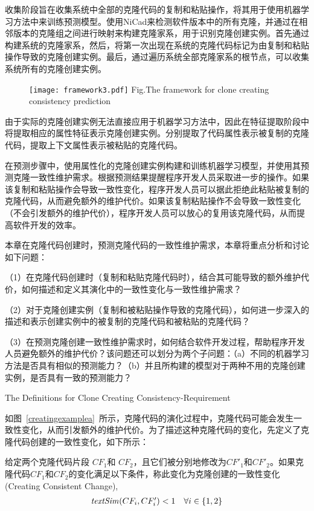 收集阶段旨在收集系统中全部的克隆代码的复制和粘贴操作，将其用于使用机器学习方法中来训练预测模型。使用NiCad来检测软件版本中的所有克隆，并通过在相邻版本的克隆组之间进行映射来构建克隆家系，用于识别克隆创建实例。首先通过构建系统的克隆家系，然后，将第一次出现在系统的克隆代码标记为由复制和粘贴操作导致的克隆创建实例。最后，通过遍历系统全部克隆家系的根节点，可以收集系统所有的克隆创建实例。

\begin{figure}[htbp]
\centering
\texttt{[image: framework3.pdf]}
{Fig.$\!$}{The framework for clone creating consistency prediction}
\vspace{-1em}
\end{figure}

由于实际的克隆创建实例无法直接应用于机器学习方法中，因此在特征提取阶段中将提取相应的属性特征表示克隆创建实例。分别提取了代码属性表示被复制的克隆代码，提取上下文属性表示被粘贴的克隆代码。

在预测步骤中，使用属性化的克隆创建实例构建和训练机器学习模型，并使用其预测克隆一致性维护需求。根据预测结果提醒程序开发人员采取进一步的操作。如果该复制和粘贴操作会导致一致性变化，程序开发人员可以据此拒绝此粘贴被复制的克隆代码，从而避免额外的维护代价。如果该复制粘贴操作不会导致一致性变化（不会引发额外的维护代价），程序开发人员可以放心的复用该克隆代码，从而提高软件开发的效率。

本章在克隆代码创建时，预测克隆代码的一致性维护需求，本章将重点分析和讨论如下问题：

（1）在克隆代码创建时（复制和粘贴克隆代码时），结合其可能导致的额外维护代价，如何描述和定义其演化中的一致性变化与一致性维护需求？

（2）对于克隆创建实例（复制和被粘贴操作导致的克隆代码），如何进一步深入的描述和表示创建实例中的被复制的克隆代码和被粘贴的克隆代码？

（3）在预测克隆创建一致性维护需求时，如何结合软件开发过程，帮助程序开发人员避免额外的维护代价？该问题还可以划分为两个子问题：（a）不同的机器学习方法是否具有相似的预测能力？（b）并且所构建的模型对于两种不用的克隆创建实例，是否具有一致的预测能力？


{The Definitions for Clone Creating Consistency-Requirement}

如图~\ref{creatingexamplea}~所示，克隆代码的演化过程中，克隆代码可能会发生一致性变化，从而引发额外的维护代价。为了描述这种克隆代码的变化，先定义了克隆代码创建的一致性变化，如下所示：

\begin{definition}[克隆创建一致性变化]  
\label{def-creatingchange}
给定两个克隆代码片段 $CF_1$和 $CF_2$，且它们被分别地修改为$CF'_1$和$CF'_2$。如果克隆代码$CF_1$和$CF_2$的变化满足以下条件，称此变化为克隆创建的一致性变化(Creating Consistent Change), 
  \[
  \begin{array}[t]{cr}
    \mathit{textSim}(CF_i, CF'_i) < 1 & \forall i \in \{1,2\}  \\
  \end{array}
  \]
\end{definition}

